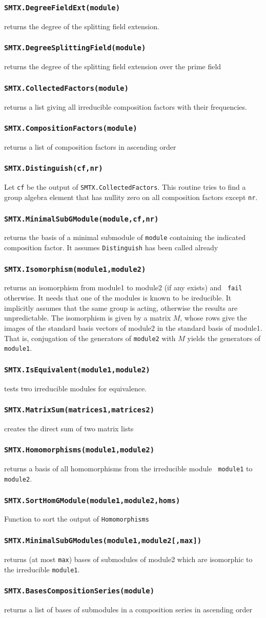 \documentclass[12pt]{article}
\def\smtxcmd#1{\subsubsection*{{\tt #1}}}
\begin{document}
\smtxcmd{SMTX.DegreeFieldExt(module)}
returns the degree of the splitting field extension.

\smtxcmd{SMTX.DegreeSplittingField(module)}
returns the degree of the splitting field extension over the prime field

\smtxcmd{SMTX.CollectedFactors(module)}
returns a list giving all irreducible composition factors with their
frequencies.

\smtxcmd{SMTX.CompositionFactors(module)}
returns a list of composition factors in ascending order

\smtxcmd{SMTX.Distinguish(cf,nr)}
Let {\tt cf} be the output of {\tt SMTX.CollectedFactors}. This routine
tries to find a group algebra element that has nullity zero on all
composition factors except {\tt nr}.

\smtxcmd{SMTX.MinimalSubGModule(module,cf,nr)}
returns the basis of a minimal submodule of {\tt module} containing the
indicated composition factor. It assumes {\tt Distinguish} has been called
already

\smtxcmd{SMTX.Isomorphism(module1,module2)}
returns an isomorphism from module1 to module2 (if any exists) and {\tt
fail} otherwise. It needs that one of the modules is known to be
ireducible. It implicitly assumes that the same group is acting, otherwise
the results are unpredictable.
The isomorphism is given by a matrix $M$, whose rows give the images of the
standard basis vectors of module2 in the standard basis of module1. That is,
conjugation of the generators of {\tt module2} with $M$ yields the
generators of {\tt module1}.

\smtxcmd{SMTX.IsEquivalent(module1,module2)}
tests two irreducible modules for equivalence.

\smtxcmd{SMTX.MatrixSum(matrices1,matrices2)}
creates the direct sum of two matrix lists

\smtxcmd{SMTX.Homomorphisms(module1,module2)}
returns a basis of all homomorphisms from the irreducible module {\tt
module1} to {\tt module2}.

\smtxcmd{SMTX.SortHomGModule(module1,module2,homs)}
Function to sort the output of {\tt Homomorphisms}

\smtxcmd{SMTX.MinimalSubGModules(module1,module2[,max])}
returns (at most {\tt max}) bases of submodules of module2 which are
isomorphic to the irreducible {\tt module1}.

\smtxcmd{SMTX.BasesCompositionSeries(module)}
returns a list of bases of submodules in a composition series in ascending
order
\end{document}
